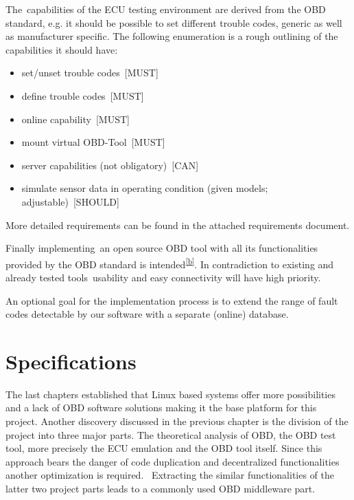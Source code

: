 {The}{~capabilities of the ECU testing environment are derived from the
OBD standard, e.g. it should be possible to set different trouble codes,
generic as well as manufacturer specific}{. The following enumeration is
a rough outlining of the capabilities it should have}{:}

\begin{itemize}
\tightlist
\item
  {set/unset trouble codes}{~{[}MUST{]}}
\item
  {define trouble codes}{~{[}MUST{]}}
\item
  {online capability}{~{[}MUST{]}}
\item
  {mount virtual OBD-Tool}{~{[}MUST{]}}
\item
  {server capabilities (not obligatory)}{~{[}CAN{]}}
\item
  {simulate sensor data in operating condition (given models;
  adjustable)}{~{[}SHOULD{]}}
\end{itemize}

{}

{More detailed requirements can be found in the attached requirements
document.}

{Finally implement}{ing}{~an open source OBD tool with all its
functionalities provided by the OBD standard is
}{intended}\textsuperscript{\protect\hyperlink{cmnt2}{{[}b{]}}}{. In
contradiction to existing and already tested tools}{~usability and easy
connectivity will have high priority.}

{An optional goal for the implementation process is to extend the range
of fault codes }{detectable }{by our software with a separate (online)
database.}

\hypertarget{h.4p7xi5bvhxdr}{\section{\texorpdfstring{{Specifications}}{Specifications}}\label{h.4p7xi5bvhxdr}}

{The last chapters established that Linux based systems offer more
possibilities and a lack of OBD software solutions making it the base
platform for this project. Another discovery discussed in the previous
chapter is the division of the project into three major parts. The
theoretical analysis of OBD, the OBD test tool, more precisely the ECU
emulation and the OBD tool itself. }{Since this approach bears the
danger of code duplication and decentralized functionalities another
optimization is required. ~Extracting the similar functionalities }{of
the latter two project parts leads to a commonly used OBD middleware
part. }

